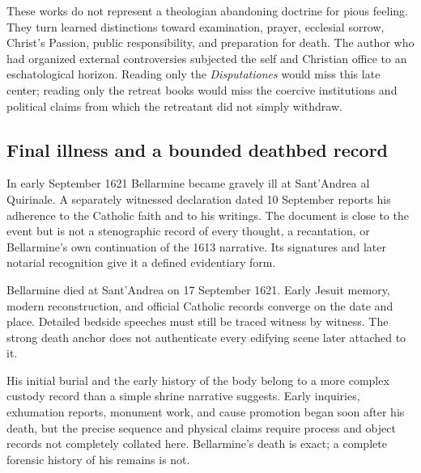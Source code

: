 These works do not represent a theologian abandoning doctrine for pious
feeling.  They turn learned distinctions toward examination, prayer,
ecclesial sorrow, Christ's Passion, public responsibility, and preparation for
death.  The author who had organized external controversies subjected the
self and Christian office to an eschatological horizon.  Reading only the
\emph{Disputationes} would miss this late center; reading only the retreat
books would miss the coercive institutions and political claims from which the
retreatant did not simply withdraw.

\subsection{Final illness and a bounded deathbed record}

In early September 1621 Bellarmine became gravely ill at Sant'Andrea al
Quirinale.  A separately witnessed declaration dated 10 September reports his
adherence to the Catholic faith and to his writings.  The document is close to
the event but is not a stenographic record of every thought, a recantation, or
Bellarmine's own continuation of the 1613 narrative.  Its signatures and later
notarial recognition give it a defined evidentiary form.

Bellarmine died at Sant'Andrea on 17 September 1621.  Early Jesuit memory,
modern reconstruction, and official Catholic records converge on the date and
place.  Detailed bedside speeches must still be traced witness by witness.
The strong death anchor does not authenticate every edifying scene later
attached to it.

His initial burial and the early history of the body belong to a more complex
custody record than a simple shrine narrative suggests.  Early inquiries,
exhumation reports, monument work, and cause promotion began soon after his
death, but the precise sequence and physical claims require process and object
records not completely collated here.  Bellarmine's death is exact; a complete
forensic history of his remains is not.

